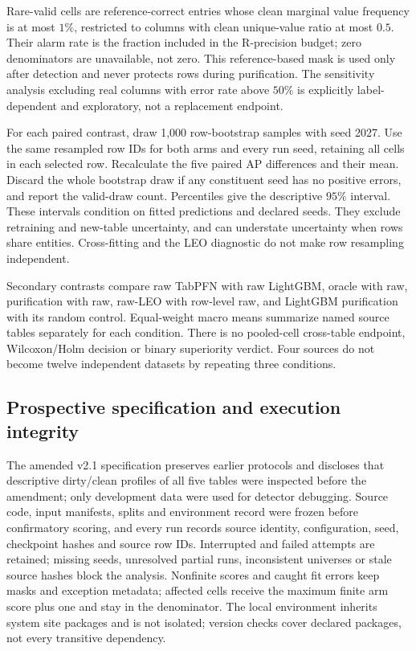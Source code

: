 Rare-valid cells are reference-correct entries whose clean marginal value
frequency is at most $1\%$, restricted to columns with clean unique-value ratio
at most $0.5$. Their alarm rate is the fraction included in the R-precision
budget; zero denominators are unavailable, not zero. This reference-based
mask is used only after detection and never protects rows during purification.
The sensitivity analysis excluding real columns with error rate above $50\%$
is explicitly label-dependent and exploratory, not a replacement endpoint.

For each paired contrast, draw 1,000 row-bootstrap samples with seed 2027.
Use the same resampled row IDs for both arms and every run seed, retaining
all cells in each selected row. Recalculate the five paired AP differences
and their mean. Discard the whole bootstrap draw if any constituent seed
has no positive errors, and report the valid-draw count. Percentiles give
the descriptive $95\%$ interval. These intervals condition on fitted predictions
and declared seeds. They exclude retraining and new-table uncertainty, and
can understate uncertainty when rows share entities. Cross-fitting and the
LEO diagnostic do not make row resampling independent.

Secondary contrasts compare raw TabPFN with raw LightGBM, oracle with raw,
purification with raw, raw-LEO with row-level raw, and LightGBM purification
with its random control. Equal-weight macro means summarize named source
tables separately for each condition. There is no pooled-cell cross-table
endpoint, Wilcoxon/Holm decision or binary superiority verdict. Four sources
do not become twelve independent datasets by repeating three conditions.

\subsection{Prospective specification and execution integrity}
The amended v2.1 specification preserves earlier protocols and discloses that
descriptive dirty/clean profiles of all five tables were inspected before the
amendment; only development data were used for detector debugging. Source code,
input manifests, splits and environment record were frozen before confirmatory
scoring, and every run records source identity, configuration, seed, checkpoint
hashes and source row IDs. Interrupted and failed attempts are retained; missing
seeds, unresolved partial runs, inconsistent universes or stale source hashes block
the analysis. Nonfinite scores and caught fit errors keep masks and exception
metadata; affected cells receive the maximum finite arm score plus one and stay in
the denominator. The local environment inherits system site packages and is not
isolated; version checks cover declared packages, not every transitive dependency.
